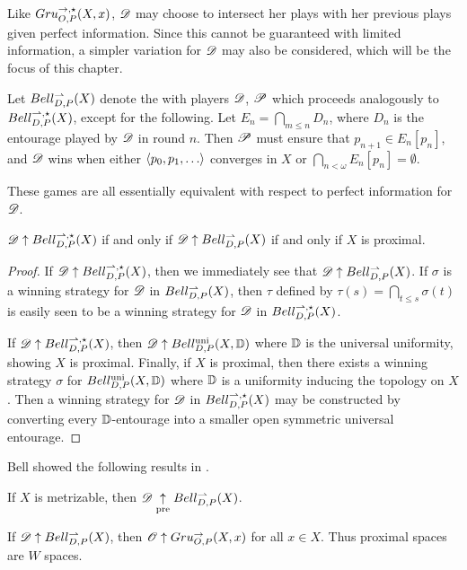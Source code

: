 Like $Gru_{O,P}^{\to,\star}(X,x)$, $\mathscr{D}$ may choose to intersect her
plays with her previous plays given perfect information. Since this cannot
be guaranteed with limited information, a simpler variation for $\mathscr{D}$
may also be considered, which will be the focus of this chapter.

\begin{game}
  Let $Bell_{D,P}^{\rightharpoonup}(X)$ denote the  with players
  $\mathscr{D}$, $\mathscr{P}$ which proceeds analogously to $Bell_{D,P}^{\rightharpoonup,\star}(X)$, except
  for the following. Let $E_n=\bigcap_{m\leq n}D_n$, where $D_n$ is the
  entourage played by $\mathscr{D}$ in round $n$.
  Then $\mathscr{P}$ must ensure that $p_{n+1}\in E_n[p_n]$,
  and $\mathscr{D}$ wins when either $\<p_0,p_1,\dots\>$ converges in $X$
  or $\bigcap_{n<\omega}E_n[p_n] = \emptyset$.
\end{game}

These games are all essentially equivalent with respect to perfect
information for $\mathscr{D}$.

\begin{thm}
  $\mathscr{D}\uparrow Bell_{D,P}^{\rightharpoonup,\star}(X)$ if and only if
  $\mathscr{D}\uparrow Bell_{D,P}^{\rightharpoonup}(X)$ if and only if
  $X$ is proximal.
\end{thm}

\begin{proof}
  If $\mathscr{D}\uparrow Bell_{D,P}^{\rightharpoonup,\star}(X)$, then we immediately see that
  $\mathscr{D}\uparrow Bell_{D,P}^{\rightharpoonup}(X)$. If $\sigma$ is a winning strategy for $\mathscr{D}$
  in $Bell_{D,P}^{\rightharpoonup}(X)$, then $\tau$ defined by
  $\tau(s)=\bigcap_{t\leq s}\sigma(t)$ is easily seen to be a winning strategy
  for $\mathscr{D}$ in $Bell_{D,P}^{\rightharpoonup,\star}(X)$.

  If $\mathscr{D}\uparrow Bell_{D,P}^{\rightharpoonup,\star}(X)$, then $\mathscr{D}\uparrow Bell_{D,P}^{\textrm{uni}}(X,\mathbb{D})$
  where $\mathbb{D}$ is the universal uniformity, showing $X$ is proximal.
  Finally, if $X$ is proximal, then there exists a winning strategy $\sigma$
  for $Bell_{D,P}^{\textrm{uni}}(X,\mathbb{D})$ where $\mathbb{D}$ is a uniformity inducing the
  topology on $X$. Then a winning strategy for $\mathscr{D}$ in $Bell_{D,P}^{\rightharpoonup,\star}(X)$
  may be constructed by converting every $\mathbb{D}$-entourage into a smaller
  open symmetric universal entourage.
\end{proof}

Bell showed the following results in \cite{MR3239205}.

\begin{thm}
  If $X$ is metrizable, then $\mathscr{D} \underset{\text{pre}}{\uparrow} Bell_{D,P}^{\rightharpoonup}(X)$.
\end{thm}

\begin{thm}
  If $\mathscr{D} \uparrow Bell_{D,P}^{\rightharpoonup}(X)$, then
  $\mathscr{O} \uparrow Gru_{O,P}^{\to}(X,x)$ for all $x\in X$.
  Thus proximal spaces are $W$ spaces.
\end{thm}

